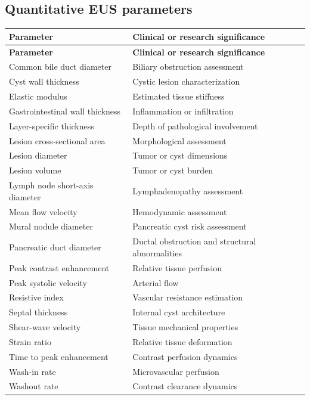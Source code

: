 \subsection{Quantitative EUS parameters}
\begin{longtable}{@{}p{}p{}@{}}
\toprule
\textbf{Parameter} & \textbf{Clinical or research significance} \\
\midrule
\endfirsthead
\toprule
\textbf{Parameter} & \textbf{Clinical or research significance} \\
\midrule
\endhead
Common bile duct diameter & Biliary obstruction assessment \\
Cyst wall thickness & Cystic lesion characterization \\
Elastic modulus & Estimated tissue stiffness \\
Gastrointestinal wall thickness & Inflammation or infiltration \\
Layer-specific thickness & Depth of pathological involvement \\
Lesion cross-sectional area & Morphological assessment \\
Lesion diameter & Tumor or cyst dimensions \\
Lesion volume & Tumor or cyst burden \\
Lymph node short-axis diameter & Lymphadenopathy assessment \\
Mean flow velocity & Hemodynamic assessment \\
Mural nodule diameter & Pancreatic cyst risk assessment \\
Pancreatic duct diameter & Ductal obstruction and structural abnormalities \\
Peak contrast enhancement & Relative tissue perfusion \\
Peak systolic velocity & Arterial flow \\
Resistive index & Vascular resistance estimation \\
Septal thickness & Internal cyst architecture \\
Shear-wave velocity & Tissue mechanical properties \\
Strain ratio & Relative tissue deformation \\
Time to peak enhancement & Contrast perfusion dynamics \\
Wash-in rate & Microvascular perfusion \\
Washout rate & Contrast clearance dynamics \\
\bottomrule
\end{longtable}

